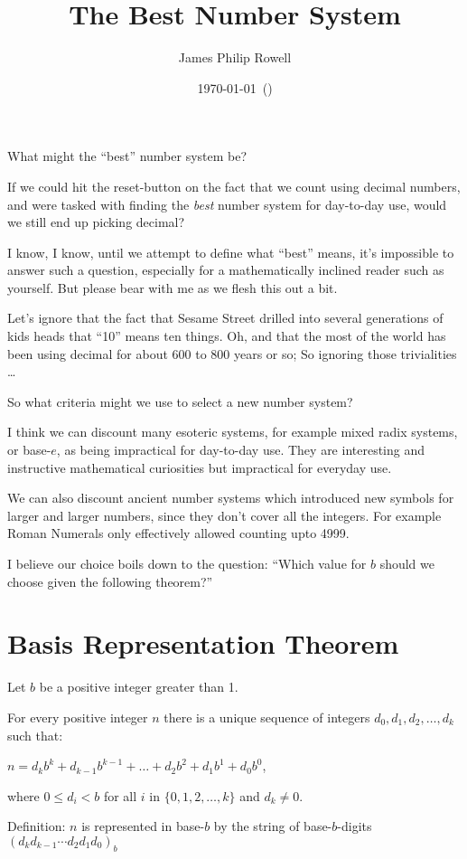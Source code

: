 \documentclass{article}
\title{\vspace{-1.5cm}The Best Number System}
\author{James Philip Rowell}
\date{\vspace{-0.5cm}\footnotesize\today\ (\jprVersion)} %
\newenvironment{jprIn}{\begin{adjustwidth}{2em}{}}{\end{adjustwidth}}
\begin{document}
\maketitle
\begin{em}
\centerline{\small{}What might the ``best'' number system be?}
\end{em}

If we could hit the reset-button on the fact that we count
using decimal numbers, and were tasked with finding the \emph{best} number system for day-to-day use,
would we still end up picking decimal?

I know, I know, until we attempt to define what ``best'' means, it's impossible to
answer such a question, especially for a mathematically inclined reader such as yourself.
But please bear with me as we flesh this out a bit.

Let's ignore that the fact
that Sesame Street drilled into several generations of kids heads
that ``10'' means ten things. Oh, and that the most of the world
has been using decimal for about 600 to 800 years or so; So ignoring those
trivialities
\dots{}

So what criteria might we use to select a new number system?

I think we can discount many esoteric systems, for example mixed radix systems,
or base-\(e\), as being impractical for day-to-day use. They are interesting
and instructive mathematical curiosities but impractical for everyday use.

We can also discount ancient number systems which introduced
new symbols for larger and larger numbers, since they don't
cover all the integers. 
For example Roman Numerals only effectively allowed counting upto 4999.

I believe our choice boils down to the question: ``Which value for \(b\) should we choose given the following theorem?''

\section*{Basis Representation Theorem}
\begin{jprIn}
Let $b$ be a positive integer greater than 1.

For every positive integer $n$ there is a unique sequence
of integers $d_0, d_1, d_2,\dots{},d_k$ such that:

\hspace{3em}$n=d_kb^k+d_{k-1}b^{k-1}+\dots+d_2b^2+d_1b^1+d_0b^0$,

where $0\le{}d_i<b$ for all $i$ in $\{0,1,2,\dots{},k\}$ and $d_k\ne0$.

Definition: $n$ is represented in base-$b$ by the string
of base-$b$-digits $(d_kd_{k-1}{\cdots}d_2d_1d_0)_b$
\end{jprIn}
\end{document}
